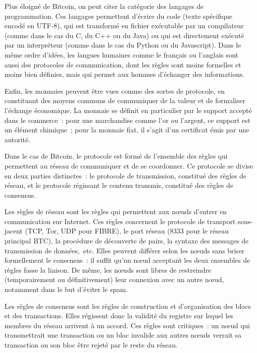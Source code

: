 Plus éloigné de Bitcoin, on peut citer la catégorie des langages de programmation. Ces langages permettent d'écrire du code (texte spécifique encodé en UTF-8), qui est transformé en fichier exécutable par un compilateur (comme dans le cas du C, du C++ ou du Java) ou qui est directement exécuté par un interpréteur (comme dans le cas du Python ou du Javascript). Dans le même ordre d'idées, les langues humaines comme le français ou l'anglais sont aussi des protocoles de communication, dont les règles sont moins formelles et moins bien définies, mais qui permet aux hommes d'échanger des informations.

Enfin, les monnaies peuvent être vues comme des sortes de protocole, en constituant des moyens communs de communiquer de la valeur et de formaliser l'échange économique. La monnaie se définit en particulier par le support accepté dans le commerce~: pour une marchandise comme l'or ou l'argent, ce support est un élément chimique~; pour la monnaie fiat, il s'agit d'un certificat émis par une autorité.

Dans le cas de Bitcoin, le protocole est formé de l'ensemble des règles qui permettent au réseau de communiquer et de se coordonner. Ce protocole se divise en deux parties distinctes~: le protocole de transmission, constitué des règles de réseau, et le protocole régissant le contenu transmis, constitué des règles de consensus.

Les règles de réseau sont les règles qui permettent aux nœuds d'entrer en communication sur Internet. Ces règles concernent le protocole de transport sous-jacent (TCP, Tor, UDP pour FIBRE), le port réseau (8333 pour le réseau principal BTC), la procédure de découverte de pairs, la syntaxe des messages de transmission de données,~etc. Elles peuvent différer selon les nœuds sans briser formellement le consensus~: il suffit qu'un nœud acceptant les deux ensembles de règles fasse la liaison. De même, les nœuds sont libres de restreindre (temporairement ou définitivement) leur connexion avec un autre nœud, notamment dans le but d'éviter le spam.

Les règles de consensus sont les règles de construction et d'organisation des blocs et des transactions. Elles régissent donc la validité du registre sur lequel les membres du réseau arrivent à un accord. Ces règles sont critiques~: un nœud qui transmettrait une transaction ou un bloc invalide aux autres nœuds verrait sa transaction ou son bloc être rejeté par le reste du réseau.

